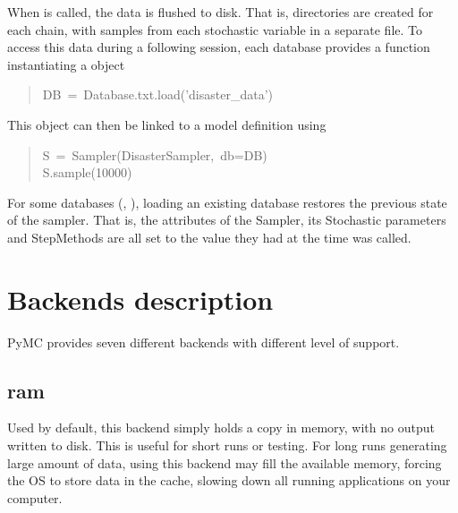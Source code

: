 When  is called, the data is flushed to disk. That is, directories are created for each chain, with samples from each stochastic variable in a separate file. To access this data during a following session, each database provides a  function instantiating a  object
\begin{quote}{\ttfamily \raggedright \noindent
DB~=~Database.txt.load('disaster{\_}data')
}\end{quote}

This  object can then be linked to a model definition using
\begin{quote}{\ttfamily \raggedright \noindent
S~=~Sampler(DisasterSampler,~db=DB)~\\
S.sample(10000)
}\end{quote}

For some databases (, ), loading an existing database restores the previous state of the sampler. That is, the attributes of the Sampler, its Stochastic parameters and StepMethods are all set to the value they had at the time  was called.



\hypertarget{backends-description}{}
\section*{Backends description}

PyMC provides seven different backends with different level of support.



\hypertarget{ram}{}
\subsection*{ram}

Used by default, this backend simply holds a copy in memory, with no output written to disk. This is useful for short runs or testing. For long runs generating large amount of data, using this backend may fill the available memory, forcing the OS to store data in the cache, slowing down all running applications on your computer.



